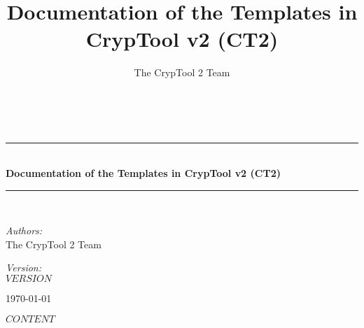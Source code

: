 \documentclass[10pt,a4paper]{scrreprt}
\title{Documentation of the Templates in CrypTool v2 (CT2)}
\author{The CrypTool 2 Team}
\newcommand{\HRule}{\rule{\linewidth}{0.5mm}}
\begin{document}
\begin{titlepage}
\begin{center}
\hspace{0pt}\\[2.5cm]

\HRule \\[0.4cm]
{ \huge \bfseries Documentation of the Templates in CrypTool v2 (CT2) }\\[0.4cm]
\HRule \\[1.5cm]

\begin{minipage}{0.4\textwidth}
\begin{flushleft} \large
\emph{Authors:} \\
The CrypTool 2 Team
\end{flushleft}
\end{minipage}
\begin{minipage}{0.4\textwidth}
\begin{flushright} \large
\emph{Version:} \\
$VERSION$
\end{flushright}
\end{minipage}
\vfill
{\large \today}
\end{center}
\end{titlepage}

\tableofcontents
\newpage

$CONTENT$
\end{document}
